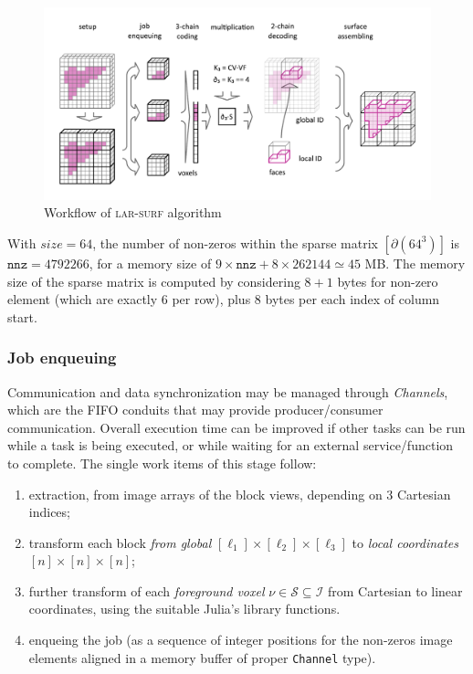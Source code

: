 \documentclass[11pt, oneside]{amsart}   	%
\begin{document}
\begin{figure}[tbp]
\includegraphics[width=\textwidth]{figs/schema_horizontal.pdf} 
\caption{Workflow of \textsc{lar-surf} algorithm}
\label{fig:schema}
\end{figure}

With $size=64$, the number of non-zeros within the sparse matrix $[\partial(64^3)]$ is $\mathtt{nnz} = 4 792 266$, for a memory size of $9\times \mathtt{nnz}+8\times 262144 \simeq 45$ MB. The memory size of the sparse matrix is computed by considering $8+1$ bytes for non-zero element (which are exactly 6 per row), plus 8 bytes per each index of column start.  


\subsubsection*{Job enqueuing}\label{sec:job-enq}
Communication and data synchronization may be managed through \emph{Channels}, which are the FIFO conduits that may provide producer/consumer communication. Overall execution time can be improved if other tasks can be run while a task is being executed, or while waiting for an external service/function to complete. The single work items of this stage follow:
\begin{enumerate}

\item extraction, from image arrays of the block views, depending on 3 Cartesian indices;

\item transform  each block \emph{from global} $[\ell_1]\times[\ell_2]\times[\ell_3]$ to \emph{local coordinates} $[n]\times[n]\times[n]$;

\item further transform of each \emph{foreground voxel} $\nu\in\mathcal{S}\subseteq\mathcal{I}$ from Cartesian to linear coordinates, using the suitable Julia's library functions.

\item enqueing the job (as a sequence of integer positions for the non-zeros image elements aligned in a memory buffer of proper \texttt{Channel} type).
\end{enumerate}
\end{document}
